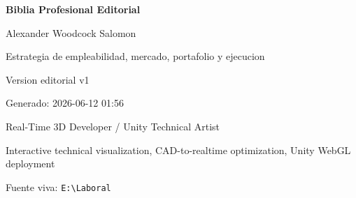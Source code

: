 \documentclass[11pt,openany]{book}
\begin{document}
\begin{titlepage}
\pagecolor{SoftAccent}
\centering
\vspace*{2.2cm}
{\Huge\bfseries\textcolor{Accent}{Biblia Profesional Editorial}\par}
\vspace{0.35cm}
{\LARGE Alexander Woodcock Salomon\par}
\vspace{1.2cm}
{\Large Estrategia de empleabilidad, mercado, portafolio y ejecucion\par}
\vspace{1.4cm}
{\large Version editorial v1\par}
{\large Generado: 2026-06-12 01:56\par}
\vfill
{\large Real-Time 3D Developer / Unity Technical Artist\par}
{\small Interactive technical visualization, CAD-to-realtime optimization, Unity WebGL deployment\par}
\vspace{1cm}
{\small Fuente viva: \texttt{E:\textbackslash{}Laboral}\par}
\clearpage
\nopagecolor
\end{titlepage}

\frontmatter
\tableofcontents
\clearpage

\mainmatter











\end{document}
